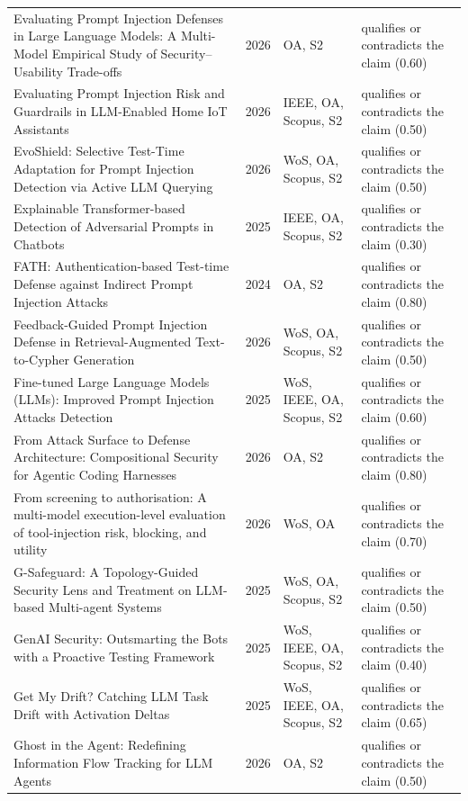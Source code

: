 \begin{longtable}{@{}%
  >{\raggedright\arraybackslash}p{}c%
  >{\raggedright\arraybackslash}p{}%
  >{\raggedright\arraybackslash}p{}@{}}
Evaluating Prompt Injection Defenses in Large Language Models: A Multi-Model Empirical Study of Security--Usability Trade-offs & 2026 & OA, S2 & qualifies or contradicts the claim (0.60) \\
Evaluating Prompt Injection Risk and Guardrails in LLM-Enabled Home IoT Assistants & 2026 & IEEE, OA, Scopus, S2 & qualifies or contradicts the claim (0.50) \\
EvoShield: Selective Test-Time Adaptation for Prompt Injection Detection via Active LLM Querying & 2026 & WoS, OA, Scopus, S2 & qualifies or contradicts the claim (0.50) \\
Explainable Transformer-based Detection of Adversarial Prompts in Chatbots & 2025 & IEEE, OA, Scopus, S2 & qualifies or contradicts the claim (0.30) \\
FATH: Authentication-based Test-time Defense against Indirect Prompt Injection Attacks & 2024 & OA, S2 & qualifies or contradicts the claim (0.80) \\
Feedback-Guided Prompt Injection Defense in Retrieval-Augmented Text-to-Cypher Generation & 2026 & WoS, OA, Scopus, S2 & qualifies or contradicts the claim (0.50) \\
Fine-tuned Large Language Models (LLMs): Improved Prompt Injection Attacks Detection & 2025 & WoS, IEEE, OA, Scopus, S2 & qualifies or contradicts the claim (0.60) \\
From Attack Surface to Defense Architecture: Compositional Security for Agentic Coding Harnesses & 2026 & OA, S2 & qualifies or contradicts the claim (0.80) \\
From screening to authorisation: A multi-model execution-level evaluation of tool-injection risk, blocking, and utility & 2026 & WoS, OA & qualifies or contradicts the claim (0.70) \\
G-Safeguard: A Topology-Guided Security Lens and Treatment on LLM-based Multi-agent Systems & 2025 & WoS, OA, Scopus, S2 & qualifies or contradicts the claim (0.50) \\
GenAI Security: Outsmarting the Bots with a Proactive Testing Framework & 2025 & WoS, IEEE, OA, Scopus, S2 & qualifies or contradicts the claim (0.40) \\
Get My Drift? Catching LLM Task Drift with Activation Deltas & 2025 & WoS, IEEE, OA, Scopus, S2 & qualifies or contradicts the claim (0.65) \\
Ghost in the Agent: Redefining Information Flow Tracking for LLM Agents & 2026 & OA, S2 & qualifies or contradicts the claim (0.50) \\

\end{longtable}
